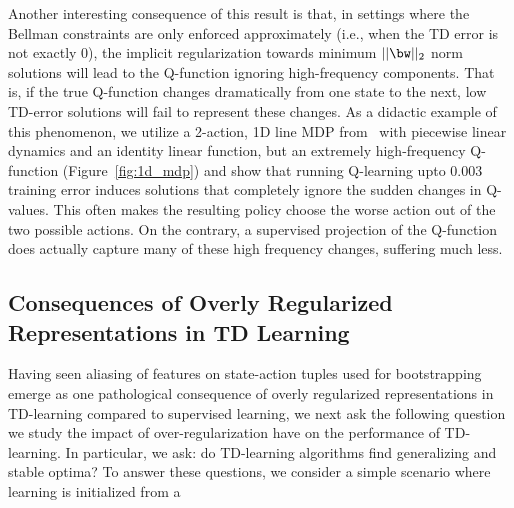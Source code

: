 Another interesting consequence of this result is that, in settings where the Bellman constraints
are only enforced approximately (i.e., when the TD error
is not exactly 0), the implicit regularization towards minimum $||\bw||_2$ norm solutions will lead to the Q-function ignoring high-frequency components. That is, if the true Q-function changes dramatically from one state to the next, low TD-error solutions will fail to represent these changes.
As a didactic example of this phenomenon, we utilize a 2-action, 1D line MDP from~\citep{dong2020expressivity} with piecewise linear dynamics and an identity linear function, but an extremely high-frequency Q-function (Figure~\ref{fig:1d_mdp}) and show that running Q-learning upto 0.003 training error induces solutions that completely ignore the sudden changes in Q-values. This often makes the resulting policy choose the worse action out of the two possible actions. On the contrary, a supervised projection of the Q-function does actually capture many of these high frequency changes, suffering much less.


\subsection{Consequences of Overly Regularized Representations in TD Learning}
Having seen aliasing of features on state-action tuples used for bootstrapping emerge as one pathological consequence of overly regularized representations in TD-learning compared to supervised learning, we next ask the following question we study the impact of over-regularization have on the performance of TD-learning. In particular, we ask: do TD-learning algorithms find generalizing and stable optima? To answer these questions, we consider a simple scenario where learning is initialized from a 


